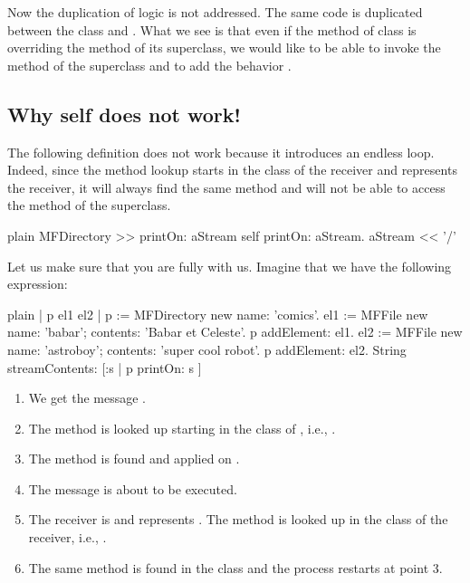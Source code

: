 \documentclass[10pt,twoside,english]{_support/latex/sbabook/sbabook}
\begin{document}
Now the duplication of logic is not addressed. The same code is duplicated between the class  and . What we see is that even if the method  of class  is overriding the method of its superclass, we would like to be able to invoke the method of the superclass  and to add the behavior . 
\subsection{Why self does not work!}
The following definition does not work because it introduces an endless loop. Indeed, since the method lookup starts in the class of the receiver and  represents the receiver, it will always find the same method and will not be able to access the method of the superclass.

\begin{displaycode}{plain}
MFDirectory >> printOn: aStream
	self printOn: aStream.
	aStream << '/'
\end{displaycode}

Let us make sure that you are fully with us. Imagine that we have the following expression: 

\begin{displaycode}{plain}
| p el1 el2 |
p := MFDirectory new name: 'comics'.
el1 := MFFile new name: 'babar'; contents: 'Babar et Celeste'.
p addElement: el1.
el2 := MFFile new name: 'astroboy'; contents: 'super cool robot'.
p addElement: el2.
String streamContents: [:s | p printOn: s ]
\end{displaycode}

\begin{enumerate}
\item We get the message .
\item The method  is looked up starting in the class of , i.e., .
\item The method is found and applied on .
\item The message   is about to be executed.
\item The receiver is  and represents . The method  is looked up in the class of the receiver,  i.e., .
\item The same method is found in the class  and the process restarts at point 3.
\end{enumerate}
\end{document}
